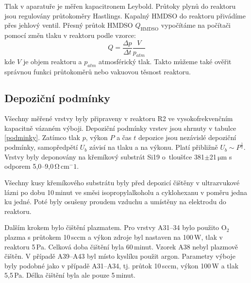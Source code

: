 \documentclass[12pt,oneside,final]{fithesis2}
\begin{document}
Tlak v aparatuře je měřen kapacitronem Leybold. Průtoky plynů do reaktoru jsou regulovány průtokoměry Hastlings. Kapalný HMDSO do reaktoru přivádíme přes jehlový ventil. Přesný průtok HMDSO $Q_{\mathrm{HMDSO}}$ vypočítáme na počítači pomocí změn tlaku v reaktoru podle vzorce:
\begin{equation} Q = \frac{\Delta p}{\Delta t} \frac{V}{p_{atm}} \end{equation}
kde $V$ je objem reaktoru a $p_{atm}$ atmosférický tlak. Takto můžeme také ověřit správnou funkci průtokoměrů nebo vakuovou těsnost reaktoru. 


\subsection{Depoziční podmínky}

Všechny měřené vrstvy byly připraveny v reaktoru R2 ve vysokofrekvenčním kapacitně vázaném výboji. Depoziční podmínky vrstev jsou shrnuty v tabulce \ref{podminky}. Zatímco tlak $p$, výkon $P$ a čas $t$ depozice jsou nezávislé depoziční podmínky, samopředpětí $U_b$ závisí na tlaku a na výkonu. Platí přibližně $U_b \sim P^{\frac{1}{2}}$. Vrstvy byly deponovány na křemíkový substrát Si19 o~tloušťce 381$\pm$21\,$\mathrm{\mu}$m s odporem 5,0--9,0\,$\mathrm{\Omega}$\,cm$^-1$.

Všechny kusy křemíkového substrátu byly před depozicí čištěny v ultrazvukové lázni po dobu 10\,minut ve směsi isopropylalkoholu a cyklohexanu v poměru jedna ku jedné. Poté byly osušeny proudem vzduchu a umístěny na elektrodu do reaktoru.

Dalším krokem bylo čištění plazmatem. Pro vrstvy A31--34 bylo použito O$_2$ plazma s průtokem 10\,sccm a výkon zdroje byl nastaven na 100\,W, tlak v reaktoru 5\,Pa. Celková doba čištění byla 60\,minut. Vzorek A38 nebyl plazmově čištěn. V případě A39--A43 byl místo kyslíku použit argon. Parametry výboje byly podobné jako v případě A31--A34, tj. průtok 10\,sccm, výkon 100\,W a tlak 5,5\,Pa. Délka čištění byla ale pouze 5\,minut. 
\end{document}
